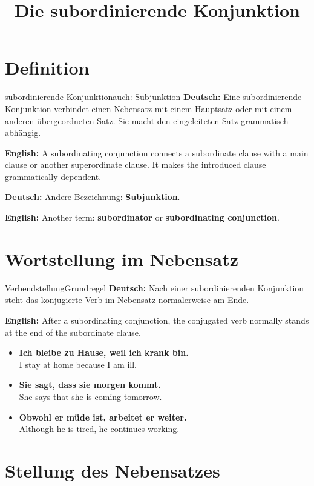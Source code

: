 \documentclass[a4paper,11pt]{article}
\title{Die subordinierende Konjunktion}
\date{}
\newcommand{\GermanText}[1]{\textbf{Deutsch: }#1\par}
\newcommand{\EnglishText}[1]{{\small\color{SoftGray}\textbf{English: }#1\par}}
\newcommand{\ExampleItem}[2]{\item \textbf{#1}\\{\small\color{SoftGray}#2}}
\begin{document}
\maketitle
\tableofcontents
\newpage

\section{Definition}

\begin{grammarentry}{subordinierende Konjunktion}{auch: Subjunktion}
\GermanText{Eine subordinierende Konjunktion verbindet einen Nebensatz mit einem Hauptsatz oder mit einem anderen übergeordneten Satz. Sie macht den eingeleiteten Satz grammatisch abhängig.}
\EnglishText{A subordinating conjunction connects a subordinate clause with a main clause or another superordinate clause. It makes the introduced clause grammatically dependent.}

\GermanText{Andere Bezeichnung: \textbf{Subjunktion}.}
\EnglishText{Another term: \textbf{subordinator} or \textbf{subordinating conjunction}.}
\end{grammarentry}

\section{Wortstellung im Nebensatz}

\begin{grammarentry}{Verbendstellung}{Grundregel}
\GermanText{Nach einer subordinierenden Konjunktion steht das konjugierte Verb im Nebensatz normalerweise am Ende.}
\EnglishText{After a subordinating conjunction, the conjugated verb normally stands at the end of the subordinate clause.}
\end{grammarentry}

\begin{exbox}
\begin{itemize}
\ExampleItem{Ich bleibe zu Hause, weil ich krank bin.}{I stay at home because I am ill.}
\ExampleItem{Sie sagt, dass sie morgen kommt.}{She says that she is coming tomorrow.}
\ExampleItem{Obwohl er müde ist, arbeitet er weiter.}{Although he is tired, he continues working.}
\end{itemize}
\end{exbox}

\section{Stellung des Nebensatzes}
\end{document}
